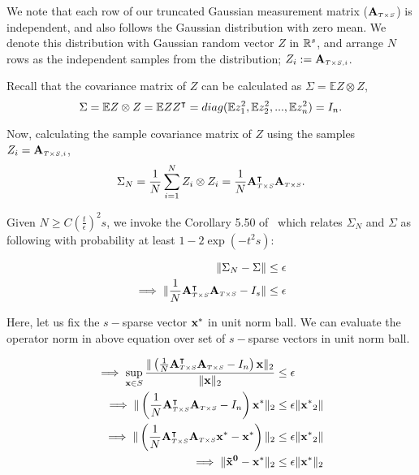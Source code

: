 We note that each row of our truncated Gaussian measurement matrix ($\mathbf{A}_{\scriptscriptstyle{T\times S}}$) is independent, and also follows the Gaussian distribution with zero mean.  
We denote this distribution with Gaussian random vector $Z$ in ${\mathbb{R}}^s$, and arrange $N$ rows as the independent samples from the distribution; $Z_i := \mathbf{A}_{\scriptscriptstyle{T\times S},i}$. 

Recall that the covariance matrix of $Z$ can be calculated as $\Sigma = \mathbb{E}Z\otimes Z$,
$$
\Sigma= \mathbb{E}Z\otimes Z = \mathbb{E} ZZ^\intercal = diag(\mathbb{E}z_1^2,\mathbb{E}z_2^2,...,\mathbb{E}z_n^2) = I_n.
$$

Now, calculating the sample covariance matrix of $Z$ using the samples $Z_i = \mathbf{A}_{\scriptscriptstyle{T\times S},i}$,
$$
\Sigma_N = \frac{1}{N}\sum_{i=1}^{N}Z_i \otimes Z_i = \frac{1}{N} \mathbf{A}_{\scriptscriptstyle{T\times S}}^\intercal \mathbf{A}_{\scriptscriptstyle{T\times S}}.
$$

Given $N \geq C(\frac{t}{\epsilon})^2s$, we invoke the Corollary 5.50 of~\cite{vershynin2010introduction} which relates $\Sigma_N$ and $\Sigma$ as following with probability at least $1 - 2\exp\left(-t^2s\right)$:

\begin{align*}
\|\Sigma_N - \Sigma\| &\leq \epsilon \\
\implies \|\frac{1}{N} \mathbf{A}_{\scriptscriptstyle{T\times S}}^\intercal \mathbf{A}_{\scriptscriptstyle{T\times S}} - I_s\| &\leq \epsilon \\
\end{align*}

Here, let us fix the $s-$sparse vector $\mathbf{x^*}$ in unit norm ball. We can evaluate the operator norm in above equation over set of $s-$sparse vectors in unit norm ball.

\begin{align*}
\implies \sup_{\mathbf{x} \in S} \frac{\|\left(\frac{1}{N} \mathbf{A}_{\scriptscriptstyle{T\times S}}^\intercal \mathbf{A}_{\scriptscriptstyle{T\times S}} - I_n\right)\mathbf{x}\|_2}{\|\mathbf{x}\|_2} &\leq \epsilon \\
\implies \|\left(\frac{1}{N} \mathbf{A}_{\scriptscriptstyle{T\times S}}^\intercal \mathbf{A}_{\scriptscriptstyle{T\times S}} - I_n\right)\mathbf{x^*}\|_2 &\leq \epsilon \|\mathbf{x^*}_2\| \\
\implies \|\left(\frac{1}{N} \mathbf{A}_{\scriptscriptstyle{T\times S}}^\intercal \mathbf{A}_{\scriptscriptstyle{T\times S}}\mathbf{x^*} - \mathbf{x^*}\right)\|_2 &\leq \epsilon \|\mathbf{x^*}_2\| \\
\implies \|\mathbf{\tilde{x}^0} - \mathbf{x^*}\|_2 &\leq \epsilon \|\mathbf{x^*}\|_2 \\
\end{align*}

